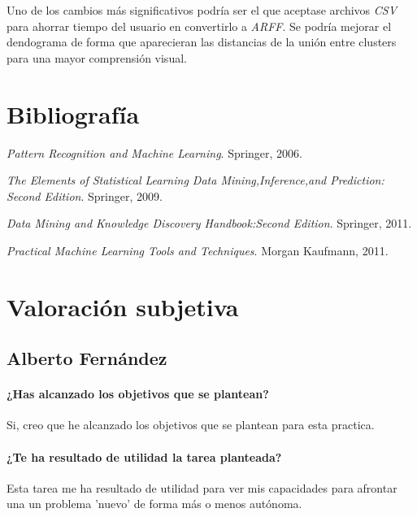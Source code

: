 \documentclass[11pt, titlepage,a4paper]{article}
\begin{document}
Uno de los cambios más significativos podría ser el que aceptase archivos
\textit{CSV} para ahorrar tiempo del usuario en convertirlo a \textit{ARFF}. Se
podría mejorar el dendograma de forma que aparecieran las distancias de la unión
entre clusters para una mayor comprensión visual.

\section{Bibliografía}
\renewcommand{\refname}{\ }

\begin{thebibliography}{1}
	
	{\em Pattern Recognition and Machine Learning}.
	\newblock Springer, 2006.
	
	{\em The Elements of Statistical Learning Data Mining,Inference,and Prediction:
		Second Edition}.
	\newblock Springer, 2009.
	
	{\em Data Mining and Knowledge Discovery Handbook:Second Edition}.
	\newblock Springer, 2011.
	
	{\em Practical Machine Learning Tools and Techniques}.
	\newblock Morgan Kaufmann, 2011.
	
\end{thebibliography}

\section{Valoración subjetiva}

\subsection{Alberto Fernández}
\paragraph{¿Has alcanzado los objetivos que se plantean?\\}
Si, creo que he alcanzado los objetivos que se plantean para esta practica.

\paragraph{¿Te ha resultado de utilidad la tarea planteada?\\}
Esta tarea me ha resultado de utilidad para ver mis capacidades para afrontar
una un problema 'nuevo' de forma más o menos autónoma.
\end{document}
